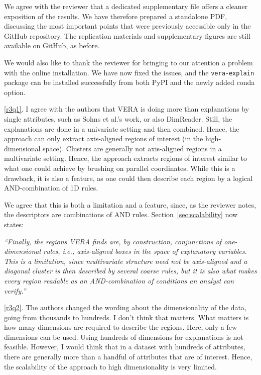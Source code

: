 \documentclass[11pt]{article}
\newcounter{rtaskno}
\newcommand{\rtask}[1]{\refstepcounter{rtaskno}\label{#1}}
\newcommand{\reviewc}[2]{\begin{leftbar}\noindent\rtask{#1}\ref{#1}. #2\end{leftbar}\vspace*{-4mm}}
\newcommand{\answer}[1]{\noindent #1\par\vspace{2mm}}
\newcommand{\copyquote}[1]{\vspace{1mm} {\itshape ``#1''}\vspace{1mm}}
\newlength{\leftbarwidth}
\newlength{\leftbarsep}
\renewenvironment{leftbar}{%
    \def\FrameCommand{{\color{black}{\vrule width \leftbarwidth\relax\hspace {\leftbarsep}}}}%
    \MakeFramed {\advance \hsize -\width \FrameRestore }%
}{\endMakeFramed}
\begin{document}
\answer{We agree with the reviewer that a dedicated supplementary file offers a cleaner exposition of the results. We have therefore prepared a standalone PDF, discussing the most important points that were previously accessible only in the GitHub repository.
The replication materials and supplementary figures are still available on GitHub, as before.

We would also like to thank the reviewer for bringing to our attention a problem with the online installation. We have now fixed the issues, and the \texttt{vera-explain} package can be installed successfully from both PyPI and the newly added conda option.}

\reviewc{r3q1}{I agree with the authors that VERA is doing more than explanations by single attributes, such as Sohns et al.'s work, or also DimReader. Still, the explanations are done in a univariate setting and then combined. Hence, the approach can only extract axis-aligned regions of interest (in the high-dimensional space). Clusters are generally not axis-aligned regions in a multivariate setting. Hence, the approach extracts regions of interest similar to what one could achieve by brushing on parallel coordinates. While this is a drawback, it is also a feature, as one could then describe each region by a logical AND-combination of 1D rules.}

\answer{%
We agree that this is both a limitation and a feature, since, as the reviewer notes, the descriptors are combinations of AND rules.
Section~\ref{sec:scalability} now states:

\copyquote{Finally, the regions VERA finds are, by construction, conjunctions of one-dimensional rules, i.e., axis-aligned boxes in the space of explanatory variables. This is a limitation, since multivariate structure need not be axis-aligned and a diagonal cluster is then described by several coarse rules, but it is also what makes every region readable as an AND-combination of conditions an analyst can verify.}
}

\reviewc{r3q2}{The authors changed the wording about the dimensionality of the data, going from thousands to hundreds. I don't think that matters. What matters is how many dimensions are required to describe the regions. Here, only a few dimensions can be used. Using hundreds of dimensions for explanations is not feasible. However, I would think that in a dataset with hundreds of attributes, there are generally more than a handful of attributes that are of interest. Hence, the scalability of the approach to high dimensionality is very limited.}
\end{document}
